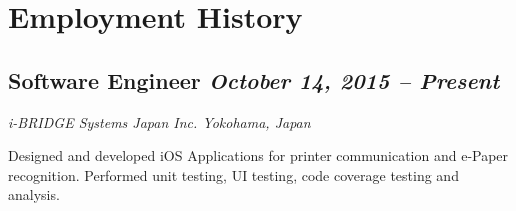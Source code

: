 \section*{Employment History}

\subsection*{{\color{special-color}Software Engineer \hfill \textnormal{\emph{October 14, 2015 -- Present}}}}
\begin{description}
  \item[\faSuitcase] \emph{i-BRIDGE Systems Japan Inc. \hfill {\color{gray}Yokohama, Japan}}
  \item Designed and developed iOS Applications for printer communication and e-Paper recognition. Performed unit testing, UI testing, code coverage testing and analysis.
\end{description}


